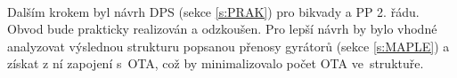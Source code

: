 \\
Dalším krokem byl návrh DPS (sekce \ref{s:PRAK}) pro bikvady a PP 2. řádu. Obvod bude prakticky realizován a odzkoušen. Pro lepší návrh by bylo vhodné analyzovat výslednou strukturu popsanou přenosy gyrátorů (sekce \ref{s:MAPLE}) a získat z ní zapojení s~OTA, což by minimalizovalo počet OTA ve~struktuře.